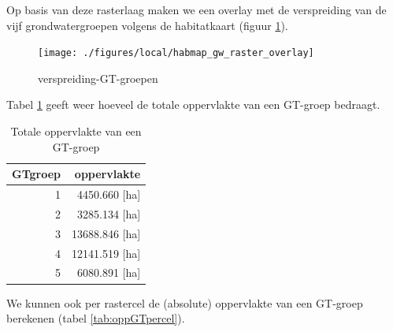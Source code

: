 \documentclass[11pt,]{book}
\begin{document}
Op basis van deze rasterlaag maken we een overlay met de verspreiding
van de vijf grondwatergroepen volgens de habitatkaart (figuur
\ref{fig:overlay-habitatkaart-GRTS-plot}).

\begin{figure}
\texttt{[image: ./figures/local/habmap\_gw\_raster\_overlay]} \caption{verspreiding-GT-groepen}\label{fig:overlay-habitatkaart-GRTS-plot}
\end{figure}

Tabel \ref{tab:totopp-gw-groep} geeft weer hoeveel de totale oppervlakte
van een GT-groep bedraagt.

\begin{table}

\caption{\label{tab:totopp-gw-groep}Totale oppervlakte van een GT-groep}
\centering
\begin{tabular}[t]{r|r}
\hline
GTgroep & oppervlakte\\
\hline
1 & 4450.660 [ha]\\
\hline
2 & 3285.134 [ha]\\
\hline
3 & 13688.846 [ha]\\
\hline
4 & 12141.519 [ha]\\
\hline
5 & 6080.891 [ha]\\
\hline
\end{tabular}
\end{table}

We kunnen ook per rastercel de (absolute) oppervlakte van een GT-groep
berekenen (tabel \ref{tab:oppGTpercel}).
\end{document}

